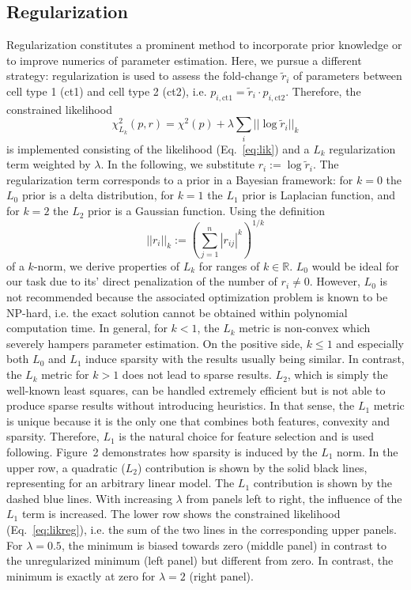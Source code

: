 \documentclass{bioinfo}
\begin{document}
\subsection{Regularization}
Regularization constitutes a prominent method to incorporate prior knowledge or to improve numerics of parameter estimation.
Here, we pursue a different strategy:
regularization is used to assess the fold-change $\tilde r_i$ of parameters between cell type 1 (ct1) and cell type 2 (ct2), i.e. $p_{i,\text{ct1}} = \tilde r_i \cdot p_{i,\text{ct2}}$.
Therefore, the constrained likelihood
\begin{equation}
\chi^2_{L_k}(p,r) = \chi^2(p) + \lambda \sum_i ||\log \tilde r_i||_k\label{eq:likreg}%
\end{equation}
is implemented consisting of the likelihood (Eq.~\ref{eq:lik}) and a $L_k$ regularization term weighted by $\lambda$.
In the following, we substitute $r_i := \log \tilde r_i$.
The regularization term corresponds to a prior in a Bayesian framework:
for $k=0$ the $L_0$ prior is a delta distribution, for $k=1$ the $L_1$ prior is Laplacian function, and for $k=2$ the $L_2$ prior is a Gaussian function.
Using the definition
\begin{equation}
||r_i||_k := {\left( \sum_{j=1}^n |r_{ij}|^k \right)}^{1/k}\label{eq:norm}%
\end{equation}
of a $k$-norm, we derive properties of $L_k$ for ranges of $k\in \mathbb R$.
$L_0$ would be ideal for our task due to its' direct penalization of the number of $r_i \neq 0$.
However, $L_0$ is not recommended because the associated optimization problem is known to be NP-hard, i.e. the exact solution cannot be obtained within polynomial computation time.
In general, for $k<1$, the $L_k$ metric is non-convex which severely hampers parameter estimation.
On the positive side, $k\leq1$ and especially both $L_0$ and $L_1$ induce sparsity with the results usually being similar.
In contrast, the $L_k$ metric for $k>1$ does not lead to sparse results.
$L_2$, which is simply the well-known least squares, can be handled extremely efficient but is not able to produce sparse results without introducing heuristics.
In that sense, the $L_1$ metric is unique because it is the only one that combines both features, convexity and sparsity.
Therefore, $L_1$ is the natural choice for feature selection and is used following.
Figure~2\vphantom{\ref{fig:02}} demonstrates how sparsity is induced by the $L_1$ norm.
In the upper row, a quadratic ($L_2$) contribution is shown by the solid black lines, representing for an arbitrary linear model.
The $L_1$ contribution is shown by the dashed blue lines.
With increasing $\lambda$ from panels left to right, the influence of the $L_1$ term is increased.
The lower row shows the constrained likelihood (Eq.~\ref{eq:likreg}), i.e. the sum of the two lines in the corresponding upper panels.
For $\lambda=0.5$, the minimum is biased towards zero (middle panel) in contrast to the unregularized minimum (left panel) but different from zero.
In contrast, the minimum is exactly at zero for $\lambda=2$ (right panel).
\end{document}
